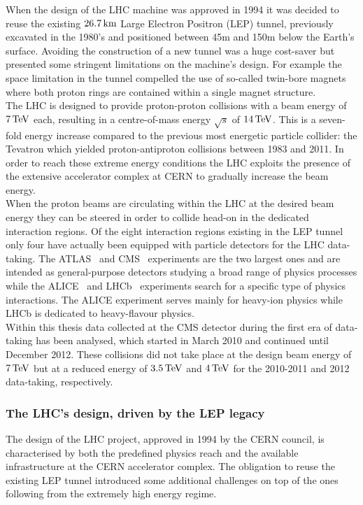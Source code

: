 When the design of the LHC machine was approved in 1994 it was decided to reuse the existing $26.7 \, \mathrm{km}$ Large Electron Positron (LEP) tunnel, previously excavated in the 1980's and positioned between 45m and 150m below the Earth's surface.
Avoiding the construction of a new tunnel was a huge cost-saver but presented some stringent limitations on the machine's design. For example the space limitation in the tunnel compelled the use of so-called twin-bore magnets where both proton rings are contained within a single magnet structure.
\\
The LHC is designed to provide proton-proton collisions with a beam energy of $7 \, \mathrm{TeV}$ each, resulting in a centre-of-mass energy $\sqrt{s}$ of $14 \, \mathrm{TeV}$. This is a seven-fold energy increase compared to the previous most energetic particle collider: the Tevatron which yielded proton-antiproton collisions between 1983 and 2011. In order to reach these extreme energy conditions the LHC exploits the presence of the extensive accelerator complex at CERN to gradually increase the beam energy. 
\\
When the proton beams are circulating within the LHC at the desired beam energy they can be steered in order to collide head-on in the dedicated interaction regions. Of the eight interaction regions existing in the LEP tunnel only four have actually been equipped with particle detectors for the LHC data-taking. The ATLAS~\cite{AtlasDetectorPaper} and CMS~\cite{CMSDetectorPaper} experiments are the two largest ones and are intended as general-purpose detectors studying a broad range of physics processes while the ALICE~\cite{AliceDetectorPaper} and LHCb~\cite{LHCbDetectorPaper} experiments search for a specific type of physics interactions. The ALICE experiment serves mainly for heavy-ion physics while LHCb is dedicated to heavy-flavour physics.
\\
Within this thesis data collected at the CMS detector during the first era of data-taking has been analysed, which started in March 2010 and continued until December 2012. These collisions did not take place at the design beam energy of $7 \, \mathrm{TeV}$ but at a reduced energy of $3.5 \, \mathrm{TeV}$ and $4 \, \mathrm{TeV}$ for the 2010-2011 and 2012 data-taking, respectively.

\subsubsection{The LHC's design, driven by the LEP legacy}
The design of the LHC project, approved in 1994 by the CERN council, is characterised by both the predefined physics reach and the available infrastructure at the CERN accelerator complex.
The obligation to reuse the existing LEP tunnel introduced some additional challenges on top of the ones following from the extremely high energy regime. 
\\

